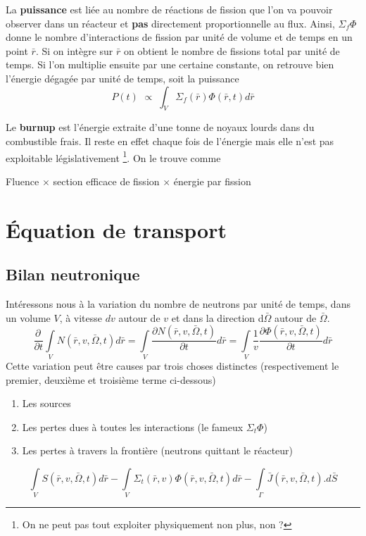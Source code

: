 La \textbf{puissance} est liée au nombre de réactions de fission que l'on va pouvoir observer dans 
un réacteur et \textbf{pas} directement proportionnelle au flux. Ainsi, $\Sigma_f\varPhi$ donne 
le nombre d'interactions de fission par unité de volume et de temps en un point $\bar r$. Si on intègre 
sur $\bar r$ on obtient le nombre de fissions total par unité de temps. Si l'on multiplie ensuite par une 
certaine constante, on retrouve bien l'énergie dégagée par unité de temps, soit la puissance
\begin{equation}
P(t)\,\, \propto \;\int_V^{} {{\Sigma _f}(\bar r)\varPhi } (\bar r,t)d\bar r
\end{equation}

Le \textbf{burnup} est l'énergie extraite d'une tonne de noyaux lourds dans du combustible frais. Il 
reste en effet chaque fois de l'énergie mais elle n'est pas exploitable législativement
\footnote{On ne peut pas tout exploiter physiquement non plus, non ?}. On le 
trouve comme
\begin{center}
Fluence $\times$ section efficace de fission $\times$ énergie par fission
\end{center}


\section{Équation de transport}
\subsection{Bilan neutronique}
Intéressons nous à la variation du nombre de neutrons par unité de temps, dans un volume $V$, à 
vitesse $dv$ autour de $v$ et dans la direction d$\bar\Omega$ autour de $\bar \Omega$.
\begin{equation}
\frac{{\partial \,}}{{\partial t}}\int\limits_V    N(\bar r,v,\bar \Omega ,t)d\bar r = \int\limits_V    \frac{{\partial N(\bar r,v,\bar \Omega ,t)}}{{\partial t}}d\bar r = \int\limits_V    \frac{1}{v}\frac{{\partial \varPhi (\bar r,v,\bar \Omega ,t)}}{{\partial t}}d\bar r
\end{equation} 
Cette variation peut être causes par trois choses distinctes (respectivement le premier, deuxième 
et troisième terme ci-dessous)
\begin{enumerate}
\item Les sources
\item Les pertes dues à toutes les interactions (le fameux $\Sigma_t\varPhi$)
\item Les pertes à travers la frontière (neutrons quittant le réacteur)
\end{enumerate}
\begin{equation}
\int\limits_V    S(\bar r,v,\bar \Omega ,t)d\bar r - \int\limits_V    {\Sigma _t}(\bar r,v)\varPhi (\bar r,v,\bar \Omega ,t)d\bar r  - \int\limits_\Gamma     \bar J(\bar r,v,\bar \Omega ,t).d\bar S
\end{equation}
\newpage

